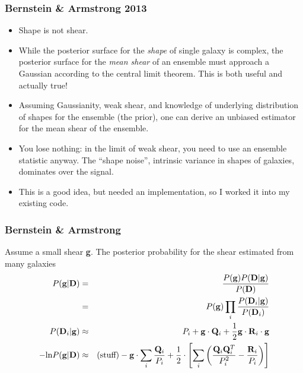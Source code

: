 \documentclass{beamer}
\newcommand{\shear}{{\bf g}}
\begin{document}
\frame
{
    \frametitle{Bernstein \& Armstrong 2013}

    \begin{itemize}

        \item Shape is not shear.
        \item While the posterior surface for the {\it shape} of single galaxy
            is complex, the posterior surface for the {\it mean shear} of an
            ensemble must approach a Gaussian according to the central limit
            theorem.  This is both useful and actually true!

         \item Assuming Gaussianity, weak shear, and knowledge of underlying
             distribution of shapes for the ensemble (the prior), one can
             derive an unbiased estimator for the mean shear of the ensemble.

         \item You lose nothing: in the limit of weak shear, you need
             to use an ensemble statistic anyway.  The ``shape noise'',
             intrinsic variance in shapes of galaxies, dominates over
             the signal.

        \item This is a good idea, but needed an implementation, so I worked it
            into my existing code.
         
    \end{itemize}

}

\frame
{
    \frametitle{Bernstein \& Armstrong}

    \fontsize{9}{0.8\baselineskip}

    Assume a small shear \shear.  The posterior probability for
    the shear estimated from many galaxies
    \begin{eqnarray}
    P(\shear | {\bf D}) & = & \frac{ P(\shear) P({\bf D}|\shear ) }{ P({\bf D}) }  \\
                        & = & P(\shear) \prod_i \frac{ P({\bf D}_i | \shear) }{ P({\bf D}_i) } \\
        P({\bf D}_i | \shear) & \approx & P_i + \shear  \cdot {\bf Q}_i + \frac{1}{2} \shear \cdot {\bf R}_i \cdot \shear \\
        -\textrm{ln} P(\shear | {\bf D}) & \approx & (\textrm{stuff})  - 
        \shear \cdot \sum_i \frac{ {\bf Q}_i }{P_i} + \frac{1}{2} \cdot \left[ \sum_i \left( \frac{ {\bf Q}_i {\bf Q}_i^T}{P_i^2} - \frac{ {\bf R}_i }{P_i} \right) \right] 
    \end{eqnarray}
}
\end{document}
